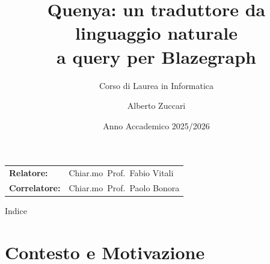 \documentclass[10pt,aspectratio=169]{beamer}
\title[Quenya: NL to SPARQL]{Quenya: un traduttore da linguaggio naturale \\ a query per Blazegraph}
\subtitle{Corso di Laurea in Informatica}
\author[Alberto Zuccari]{Alberto Zuccari}
\institute[Unibo]{
    Dipartimento di Informatica Scienza e Ingegneria \\
    Università di Bologna
}
\date[I Sessione 2026]{Anno Accademico 2025/2026}
\begin{document}
\begin{frame}
    \titlepage\vspace{-1cm}
    \begin{center}
        \small
        \begin{tabular}{ll}
            \textbf{Relatore:} & Chiar.mo~Prof.~Fabio Vitali \\
            \textbf{Correlatore:} & Chiar.mo~Prof.~Paolo Bonora \\
        \end{tabular}
    \end{center}
\end{frame}

\begin{frame}{Indice}
    \tableofcontents
\end{frame}

\section{Contesto e Motivazione}
\end{document}
